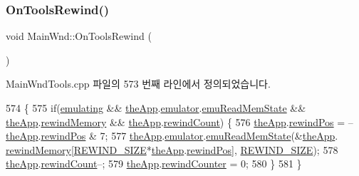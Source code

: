 \subsubsection{\texorpdfstring{On\+Tools\+Rewind()}{OnToolsRewind()}}
{\footnotesize\ttfamily void Main\+Wnd\+::\+On\+Tools\+Rewind (\begin{DoxyParamCaption}{ }\end{DoxyParamCaption})\hspace{0.3cm}{\ttfamily [protected]}}



Main\+Wnd\+Tools.\+cpp 파일의 573 번째 라인에서 정의되었습니다.


\begin{DoxyCode}
574 \{
575   \textcolor{keywordflow}{if}(\mbox{\hyperlink{_main_wnd_tools_8cpp_af9cc36078b1b311753963297ae7f2a74}{emulating}} && \mbox{\hyperlink{_v_b_a_8cpp_a8095a9d06b37a7efe3723f3218ad8fb3}{theApp}}.\mbox{\hyperlink{class_v_b_a_ab40fc008c6714c3c8670eb8a9085a4a1}{emulator}}.\mbox{\hyperlink{struct_emulated_system_aeb808d20d5ba0fe3ffa5ec59c798105f}{emuReadMemState}} && 
      \mbox{\hyperlink{_v_b_a_8cpp_a8095a9d06b37a7efe3723f3218ad8fb3}{theApp}}.\mbox{\hyperlink{class_v_b_a_ad2f4e21586cc185a1e6525080532471a}{rewindMemory}} && \mbox{\hyperlink{_v_b_a_8cpp_a8095a9d06b37a7efe3723f3218ad8fb3}{theApp}}.\mbox{\hyperlink{class_v_b_a_a39430ba84d3e7205846e24f0484d7880}{rewindCount}}) \{
576     \mbox{\hyperlink{_v_b_a_8cpp_a8095a9d06b37a7efe3723f3218ad8fb3}{theApp}}.\mbox{\hyperlink{class_v_b_a_a5d8ea18c98b5188813210a84819da5e8}{rewindPos}} = --\mbox{\hyperlink{_v_b_a_8cpp_a8095a9d06b37a7efe3723f3218ad8fb3}{theApp}}.\mbox{\hyperlink{class_v_b_a_a5d8ea18c98b5188813210a84819da5e8}{rewindPos}} & 7;
577     \mbox{\hyperlink{_v_b_a_8cpp_a8095a9d06b37a7efe3723f3218ad8fb3}{theApp}}.\mbox{\hyperlink{class_v_b_a_ab40fc008c6714c3c8670eb8a9085a4a1}{emulator}}.\mbox{\hyperlink{struct_emulated_system_aeb808d20d5ba0fe3ffa5ec59c798105f}{emuReadMemState}}(&\mbox{\hyperlink{_v_b_a_8cpp_a8095a9d06b37a7efe3723f3218ad8fb3}{theApp}}.
      \mbox{\hyperlink{class_v_b_a_ad2f4e21586cc185a1e6525080532471a}{rewindMemory}}[\mbox{\hyperlink{_s_d_l_8cpp_ac23853e466152bcbd456ac1e976f4e84}{REWIND\_SIZE}}*\mbox{\hyperlink{_v_b_a_8cpp_a8095a9d06b37a7efe3723f3218ad8fb3}{theApp}}.\mbox{\hyperlink{class_v_b_a_a5d8ea18c98b5188813210a84819da5e8}{rewindPos}}], 
      \mbox{\hyperlink{_s_d_l_8cpp_ac23853e466152bcbd456ac1e976f4e84}{REWIND\_SIZE}});
578     \mbox{\hyperlink{_v_b_a_8cpp_a8095a9d06b37a7efe3723f3218ad8fb3}{theApp}}.\mbox{\hyperlink{class_v_b_a_a39430ba84d3e7205846e24f0484d7880}{rewindCount}}--;
579     \mbox{\hyperlink{_v_b_a_8cpp_a8095a9d06b37a7efe3723f3218ad8fb3}{theApp}}.\mbox{\hyperlink{class_v_b_a_a63a3cf03d4213b2596b59226134b0d5b}{rewindCounter}} = 0;
580   \}
581 \}
\end{DoxyCode}
\mbox{\label{class_main_wnd_ab456c9b37a33a87b68dc0d3ca74b0246}} 
